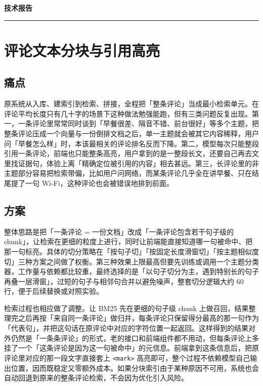 \documentclass[11pt]{ctexart}
\begin{document}
\begin{center}
\vspace*{-0.4em}
{\fontsize{19pt}{24pt}\selectfont\bfseries\color{InkBlack} 技术报告\par}
\vspace{0.6em}
{\color{Accent}\rule{2.4cm}{1.2pt}}\par
\end{center}
\vspace{0.3em}

\section{评论文本分块与引用高亮}

\subsection{痛点}

原系统从入库、建索引到检索、拼接，全程把「整条评论」当成最小检索单元。在评论平均长度只有几十字的场景下这种做法勉强能跑，但有三类问题反复出现。第一，一条评论里常常同时谈到「早餐很差、隔音不错、前台很好」等多个主题，把整条评论压成一个向量与一份倒排文档之后，单一主题就会被其它内容稀释，用户问「早餐怎么样」时，本该最相关的评论排名反而下降。第二，模型每次只能整段引用一条评论，前端也只能整条高亮，用户拿到的是一整段长文，还要自己再去文里找证据句，体验上离「精确定位被引用的内容」相去甚远。第三，长评论里的非主题部分容易把检索带偏，比如用户问网络，而某条评论几乎全在讲早餐、只在结尾提了一句 Wi-Fi，这种评论也会被错误地排到前面。

\subsection{方案}

整体思路是把「一条评论 = 一份文档」改成「一条评论包含若干句子级的 chunk」，让检索在更细的粒度上进行，同时让前端能直接知道哪一句被命中、把那一句标亮。具体的切分策略在「按句子切」「按固定长度滑窗切」「按主题相似度切」三种方案之间做了权衡。第三种效果上限最高但要先训练或调用一个主题分类器，工作量与依赖都比较重，最终选择的是「以句子切分为主，遇到特别长的句子再叠一层滑窗」，过短的句子与相邻句合并以避免噪声，整套切分逻辑大约 60 行，便于后续替换或对照实验。

检索过程也相应做了调整。让 BM25 先在更细的句子级 chunk 上做召回，结果整理完之后再按「来自同一条评论」做归并，每条评论只保留得分最高的那一句作为「代表句」，并把这句话在原评论中对应的字符位置一起返回。这样得到的结果对外仍然是「一条条评论」的形式，老的接口和前端组件都不用动，但每条评论上多挂了一个「这条评论是因为这一句被命中」的元信息。前端拿到这条信息后，把原评论里对应的那一段文字直接套上 \texttt{<mark>} 高亮即可，整个过程不依赖模型自己输出位置，因而既稳定又零额外成本。如果分块索引由于某种原因不可用，系统也会自动回退到原来的整条评论检索，不会因为优化引入风险。
\end{document}
